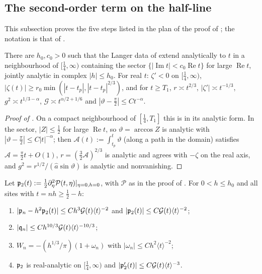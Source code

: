 \subsection{The second-order term on the half-line}\label{app:second}

This subsection proves the five steps listed in the plan of the proof of ; the
notation is that of .

\begin{lemma}\label{lem:halfline}
There are $h_0,c_0>0$ such that the Langer data of  extend analytically to
$t$ in a neighbourhood of $[\frac14,\infty)$ containing the sector
$\{|\operatorname{Im}t|<c_0\operatorname{Re}t\}$ for large $\operatorname{Re}t$, jointly analytic in complex
$|h|\le h_0$. For real $t$: $\zeta'<0$ on $[\frac14,\infty)$, $|\zeta(t)|\ge r_0\min(|t-t_p|,|t-t_p|^{2/3})$,
and for $t\ge T_1$, $r\asymp t^{2/3}$, $|\zeta'|\asymp t^{-1/3}$, $g^2\asymp t^{1/3-\alpha}$, $\mathcal G\asymp t^{\alpha/2+1/6}$
and $|\vartheta-\frac\pi2|\le Ct^{-\alpha}$.
\end{lemma}

\begin{proof}[Proof of ]
On a compact neighbourhood of $[\frac14,T_1]$ this is  in its analytic form.
In the sector, $|Z|\le\frac12$ for large $\operatorname{Re}t$, so $\vartheta=\arccos Z$ is analytic with
$|\vartheta-\frac\pi2|\le C|t|^{-\alpha}$; then $\mathcal A(t):=\int_{t_p}^t\vartheta$ (along a path in the
domain) satisfies $\mathcal A=\frac\pi2t+O(1)$, $r=(\frac32\mathcal A)^{2/3}$ is analytic and agrees with
$-\zeta$ on the real axis, and $g^2=r^{1/2}/(\hat a\sin\vartheta)$ is analytic and nonvanishing.
\end{proof}

\begin{lemma}\label{lem:decay}
Let $\mathfrak{p}_2(t):=\frac12\partial_\eta^2\mathcal P(t,\eta)|_{\eta=0,h=0}$, with $\mathcal P$ as in the proof of
. For $0<h\le h_0$ and all sites with $t=nh\ge\frac12-h$:
\begin{enumerate}
\item[(a)] $|\mathfrak{p}_n-h^2\mathfrak{p}_2(t)|\le Ch^3\mathcal G(t)\langle t\rangle^{-2}$ and $|\mathfrak{p}_2(t)|\le C\mathcal G(t)\langle t\rangle^{-2}$;
\item[(b)] $|\mathfrak{q}_n|\le Ch^{10/3}\mathcal G(t)\langle t\rangle^{-10/3}$;
\item[(c)] $W_n=-(h^{1/3}/\pi)(1+\omega_n)$ with $|\omega_n|\le Ch^2\langle t\rangle^{-2}$;
\item[(d)] $\mathfrak{p}_2$ is real-analytic on $[\frac14,\infty)$ and $|\mathfrak{p}_2'(t)|\le C\mathcal G(t)\langle t\rangle^{-3}$.
\end{enumerate}
\end{lemma}

